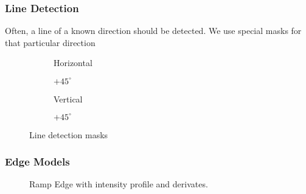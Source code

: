 \subsubsection{Line Detection}
Often, a line of a known direction should be detected. We use special masks for that particular direction
\begin{figure}[h]
	\centering
	\begin{subfigure}[b]{0.2\textwidth}
		\centering
		\caption{Horizontal}
	\end{subfigure}
	\begin{subfigure}[b]{0.2\textwidth}
		\centering
		\caption{$+45^\circ$}
	\end{subfigure}
	\begin{subfigure}[b]{0.2\textwidth}
		\centering
		\caption{Vertical}
	\end{subfigure}
	\begin{subfigure}[b]{0.2\textwidth}
		\centering
		\caption{$+45^\circ$}
	\end{subfigure}
	\caption{Line detection masks}
\end{figure}


\subsubsection{Edge Models}
\begin{figure}[!h]
	\centering
	
	\caption{Ramp Edge with intensity profile and derivates.}
\end{figure}
